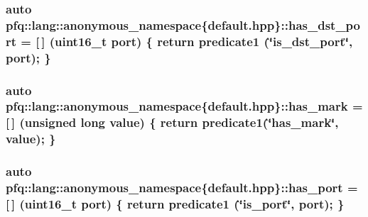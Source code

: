 \hypertarget{namespacepfq_1_1lang_1_1anonymous__namespace_02default_8hpp_03_afa71ece0f4178d0200c0388f503eef14}{
\subsubsection[{has\+\_\+dst\+\_\+port}]{\setlength{\rightskip}{0pt plus 5cm}auto pfq\+::lang\+::anonymous\+\_\+namespace\{default.\+hpp\}\+::has\+\_\+dst\+\_\+port = \mbox{[}$\,$\mbox{]} (uint16\+\_\+t {\bf port}) \{ return {\bf predicate1} (\char`\"{}is\+\_\+dst\+\_\+port\char`\"{}, port); \}}}\label{namespacepfq_1_1lang_1_1anonymous__namespace_02default_8hpp_03_afa71ece0f4178d0200c0388f503eef14}
\hypertarget{namespacepfq_1_1lang_1_1anonymous__namespace_02default_8hpp_03_aa4ce1fdb0d99e1ca0afdf76619c58d12}{
\subsubsection[{has\+\_\+mark}]{\setlength{\rightskip}{0pt plus 5cm}auto pfq\+::lang\+::anonymous\+\_\+namespace\{default.\+hpp\}\+::has\+\_\+mark = \mbox{[}$\,$\mbox{]} (unsigned long value) \{ return {\bf predicate1}(\char`\"{}has\+\_\+mark\char`\"{}, value); \}}}\label{namespacepfq_1_1lang_1_1anonymous__namespace_02default_8hpp_03_aa4ce1fdb0d99e1ca0afdf76619c58d12}
\hypertarget{namespacepfq_1_1lang_1_1anonymous__namespace_02default_8hpp_03_a9f7161b8dfb842c5a845f413eb6bc82f}{
\subsubsection[{has\+\_\+port}]{\setlength{\rightskip}{0pt plus 5cm}auto pfq\+::lang\+::anonymous\+\_\+namespace\{default.\+hpp\}\+::has\+\_\+port = \mbox{[}$\,$\mbox{]} (uint16\+\_\+t {\bf port}) \{ return {\bf predicate1} (\char`\"{}is\+\_\+port\char`\"{}, port); \}}}\label{namespacepfq_1_1lang_1_1anonymous__namespace_02default_8hpp_03_a9f7161b8dfb842c5a845f413eb6bc82f}
